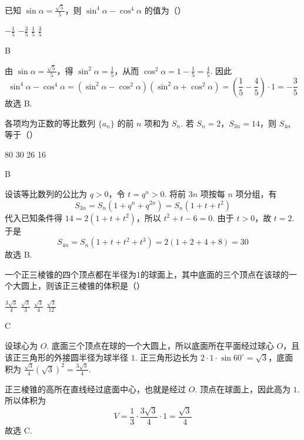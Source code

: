 \begin{problem}
已知 \(\sin \alpha = \frac{\sqrt{5}}{5}\)，则 \(\sin^4 \alpha - \cos^4 \alpha\) 的值为（\quad）

\choices
    {\(-\frac{1}{5}\)}
    {\(-\frac{3}{5}\)}
    {\(\frac{1}{5}\)}
    {\(\frac{3}{5}\)}
\end{problem}

\begin{answer}
B
\end{answer}

\begin{solution}
由 \(\sin\alpha=\frac{\sqrt5}{5}\)，得 \(\sin^2\alpha=\frac15\)，从而 \(\cos^2\alpha=1-\frac15=\frac45\). 因此
\[
\sin^4\alpha-\cos^4\alpha=(\sin^2\alpha-\cos^2\alpha)(\sin^2\alpha+\cos^2\alpha)=\left(\frac15-\frac45\right)\cdot1=-\frac35
\]
故选 B.
\end{solution}

\begin{problem}
各项均为正数的等比数列 \(\{a_{n}\}\) 的前 \(n\) 项和为 \(S_{n}\). 若 \(S_{n} = 2\)，\(S_{3n} = 14\)，则 \(S_{4n}\) 等于（\quad）

\choices
    {80}
    {30}
    {26}
    {16}
\end{problem}

\begin{answer}
B
\end{answer}

\begin{solution}
设该等比数列的公比为 \(q>0\)，令 \(t=q^n>0\). 将前 \(3n\) 项按每 \(n\) 项分组，有
\[
S_{3n}=S_n(1+q^n+q^{2n})=S_n(1+t+t^2)
\]
代入已知条件得 \(14=2(1+t+t^2)\)，所以 \(t^2+t-6=0\). 由于 \(t>0\)，故 \(t=2\). 于是
\[
S_{4n}=S_n(1+t+t^2+t^3)=2(1+2+4+8)=30
\]
故选 B.
\end{solution}

\begin{problem}
一个正三棱锥的四个顶点都在半径为1的球面上，其中底面的三个顶点在该球的一个大圆上，则该正三棱锥的体积是（\quad）

\choices
    {\(\frac{3\sqrt{3}}{4}\)}
    {\( \frac{\sqrt{3}}{3} \)}
    {\(\frac{\sqrt{3}}{4}\)}
    {\(\frac{\sqrt{3}}{12}\)}
\end{problem}

\begin{answer}
C
\end{answer}

\begin{solution}
设球心为 \(O\). 底面三个顶点在球的一个大圆上，所以底面所在平面经过球心 \(O\)，且该正三角形的外接圆半径为球半径 \(1\). 正三角形边长为
\(2\cdot1\cdot\sin60^{\circ}=\sqrt3\)，底面积为 \(\frac{\sqrt3}{4}(\sqrt3)^2=\frac{3\sqrt3}{4}\).

正三棱锥的高所在直线经过底面中心，也就是经过 \(O\). 顶点在球面上，因此高为 \(1\). 所以体积为
\[
V=\frac13\cdot\frac{3\sqrt3}{4}\cdot1=\frac{\sqrt3}{4}
\]
故选 C.
\end{solution}

